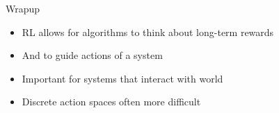 \documentclass[compress]{beamer}
\begin{document}
\begin{frame}{Wrapup}

  \begin{itemize}
    \item RL allows for algorithms to think about long-term rewards
    \item And to guide actions of a system
    \item Important for systems that interact with world
    \item Discrete action spaces often more difficult
  \end{itemize}

\end{frame}
\end{document}
